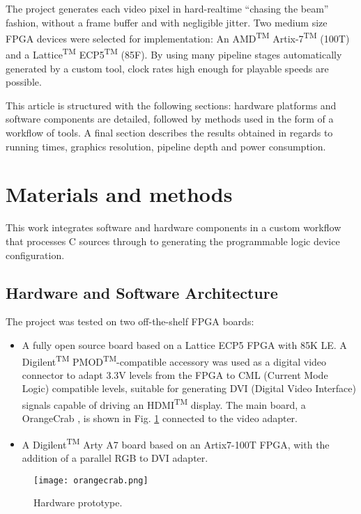 \documentclass[conference]{IEEEtran}
\begin{document}
The project generates each video pixel in hard-realtime “chasing the beam” fashion, without a frame buffer and with negligible jitter. Two medium size FPGA devices were selected for implementation: An  AMD\textsuperscript{TM}  Artix-7\textsuperscript{TM} (100T) and a Lattice\textsuperscript{TM}  ECP5\textsuperscript{TM} (85F). By using many pipeline stages automatically generated by a custom tool, clock rates high enough for playable speeds are possible.

This article is structured with the following sections: hardware platforms and software components are detailed, followed by methods used in the form of a workflow of tools. A final section describes the results obtained in regards to running times, graphics resolution, pipeline depth and power consumption.


\section{Materials and methods}
This work integrates software and hardware components in a custom workflow that processes C sources through to generating the programmable logic device configuration.

\subsection{Hardware and Software Architecture}
The project was tested on two off-the-shelf FPGA boards:

\begin{itemize}
\item A fully open source board based on a Lattice ECP5 FPGA with 85K LE. A Digilent\textsuperscript{TM} PMOD\textsuperscript{TM}-compatible accessory was used as a digital video connector to adapt 3.3V levels from the FPGA to CML (Current Mode Logic) compatible levels, suitable for generating DVI (Digital Video Interface) signals capable of driving an HDMI\textsuperscript{TM} display. The main board, a OrangeCrab \cite{orangecrab}, is shown in Fig. \ref{figboard} connected to the video adapter.
\item  A Digilent\textsuperscript{TM}  Arty A7 board based on an Artix7-100T FPGA, with the addition of a parallel RGB to DVI adapter.
\end{itemize}

\begin{figure}
\texttt{[image: orangecrab.png]}
\caption{Hardware prototype.}
\label{figboard}
\end{figure}
\end{document}

